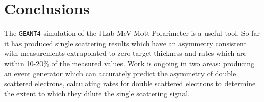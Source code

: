 \documentclass[11pt]{article}
\begin{document}
\section{Conclusions}

The \texttt{GEANT4} simulation of the JLab MeV Mott Polarimeter is a useful tool. So far it has produced single scattering results which have an asymmetry consistent with measurements extrapolated to zero target thickness and rates which are within 10-20\% of the measured values. Work is ongoing in two areas: producing an event generator which can accurately predict the asymmetry of double scattered electrons, calculating rates for double scattered electrons to determine the extent to which they dilute the single scattering signal. 
\end{document}
